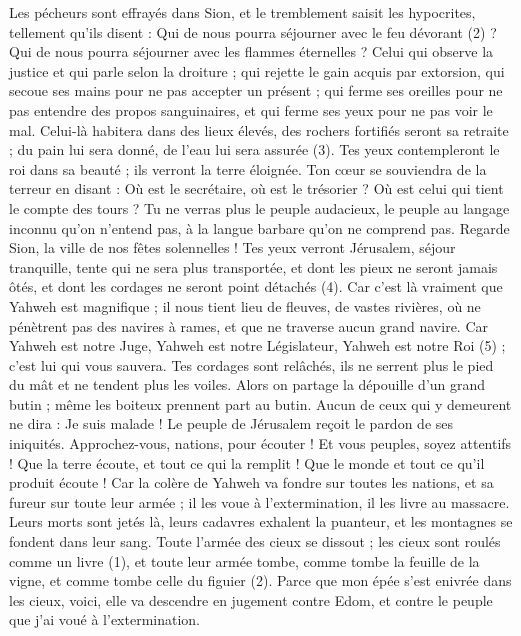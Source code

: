 \begin{multicols}{2}
{Les pécheurs sont effrayés dans Sion, et le tremblement saisit les hypocrites, tellement qu'ils disent : Qui de nous pourra séjourner avec le feu dévorant (2) ? Qui de nous pourra séjourner avec les flammes éternelles ?
Celui qui observe la justice et qui parle selon la droiture ; qui rejette le gain acquis par extorsion, qui secoue ses mains pour ne pas accepter un présent ; qui ferme ses oreilles pour ne pas entendre des propos sanguinaires, et qui ferme ses yeux pour ne pas voir le mal.
Celui-là habitera dans des lieux élevés, des rochers fortifiés seront sa retraite ; du pain lui sera donné, de l’eau lui sera assurée (3).
Tes yeux contempleront le roi dans sa beauté ; ils verront la terre éloignée.
Ton cœur se souviendra de la terreur en disant : Où est le secrétaire, où est le trésorier ? Où est celui qui tient le compte des tours ?
Tu ne verras plus le peuple audacieux, le peuple au langage inconnu qu'on n'entend pas, à la langue barbare qu'on ne comprend pas.
Regarde Sion, la ville de nos fêtes solennelles ! Tes yeux verront Jérusalem, séjour tranquille, tente qui ne sera plus transportée, et dont les pieux ne seront jamais ôtés, et dont les cordages ne seront point détachés (4).
Car c'est là vraiment que Yahweh est magnifique ; il nous tient lieu de fleuves, de vastes rivières, où ne pénètrent pas des navires à rames, et que ne traverse aucun grand navire.
Car Yahweh est notre Juge, Yahweh est notre Législateur, Yahweh est notre Roi (5) ; c'est lui qui vous sauvera.
Tes cordages sont relâchés, ils ne serrent plus le pied du mât et ne tendent plus les voiles. Alors on partage la dépouille d'un grand butin ; même les boiteux prennent part au butin.
Aucun de ceux qui y demeurent ne dira : Je suis malade ! Le peuple de Jérusalem reçoit le pardon de ses iniquités.
\VerseOne{}Approchez-vous, nations, pour écouter ! Et vous peuples, soyez attentifs ! Que la terre écoute, et tout ce qui la remplit ! Que le monde et tout ce qu’il produit écoute !
Car la colère de Yahweh va fondre sur toutes les nations, et sa fureur sur toute leur armée ; il les voue à l’extermination, il les livre au massacre.
Leurs morts sont jetés là, leurs cadavres exhalent la puanteur, et les montagnes se fondent dans leur sang.
Toute l'armée des cieux se dissout ; les cieux sont roulés comme un livre (1), et toute leur armée tombe, comme tombe la feuille de la vigne, et comme tombe celle du figuier (2).
Parce que mon épée s’est enivrée dans les cieux, voici, elle va descendre en jugement contre Edom, et contre le peuple que j'ai voué à l’extermination.
}
\end{multicols}
